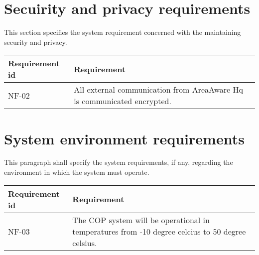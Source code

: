 



\section{Secuirity and privacy requirements}
This section specifies the system requirement concerned with the maintaining security and privacy.

\begin{longtable}{| p{3.2cm} |  p{10cm} | }
	\hline
	\textbf{Requirement id} &  \textbf{Requirement } \\
	\hline
	NF-02 &All external communication from AreaAware Hq is communicated encrypted.  \\
	\hline
\end{longtable}

\section{System environment requirements}
This paragraph shall specify the system requirements, if any, regarding the environment in which the system must operate.

\begin{longtable}{| p{3.2cm} |  p{10cm} | }
	\hline
	\textbf{Requirement id} &  \textbf{Requirement } \\
	\hline
	NF-03 & The COP system will be operational in temperatures from -10 degree celcius to 50 degree celsius.  \\
	\hline
\end{longtable}

